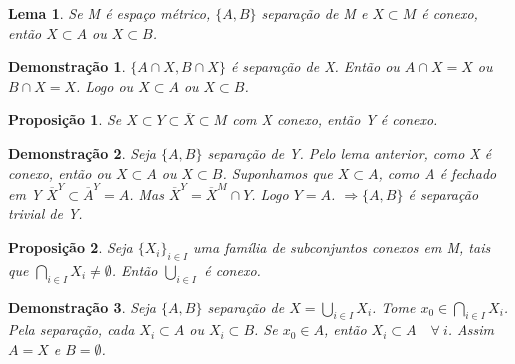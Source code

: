 \documentclass{article}
\newtheorem*{proposicao}{Proposição}
\newtheorem*{lema}{Lema}
\newtheorem*{prova}{Demonstração}
\begin{document}
\begin{lema}
    Se M é espaço métrico, $\{A, B\}$ separação de M e $X \subset M$ é conexo, então $X \subset A$ ou $X \subset B$. 
\end{lema}

\begin{prova}
    $\{A \cap X, B \cap X\}$ é separação de X. Então ou $A \cap X = X$ ou $B \cap X = X$. Logo ou $X \subset A$ ou $X \subset B$.
\end{prova}

\begin{proposicao}
    Se $X \subset Y \subset \overline{X} \subset M$ com X conexo, então Y é conexo.
\end{proposicao}

\begin{prova}
    Seja $\{A, B\}$ separação de Y. Pelo lema anterior, como X é conexo, então ou $X \subset A$ ou $X \subset B$.
    Suponhamos que $X \subset A$, como A é fechado em Y $\overline{X}^Y \subset \overline{A}^Y = A$.
    Mas $\overline{X}^Y = \overline{X}^M \cap Y$. Logo $Y = A$.
    $\Rightarrow \{A, B\}$ é separação trivial de Y.
\end{prova}

\begin{proposicao}
    Seja $\{X_i\}_{i\in I}$ uma família de subconjuntos conexos em M,
    tais que $\bigcap_{i \in I}X_i \neq \emptyset$.
    Então $\bigcup_{i \in I}$ é conexo. 
\end{proposicao}

\begin{prova}
    Seja $\{A, B\}$ separação de $X = \bigcup_{i\in I}X_i$.
    Tome $x_0 \in \bigcap_{i \in I} X_i$.
    Pela separação, cada $X_i \subset A$ ou $X_i \subset B$.
    Se $x_0 \in A$, então $X_i \subset A \quad \forall \: i$.
    Assim $A = X$ e $B = \emptyset$.
\end{prova}
\end{document}
